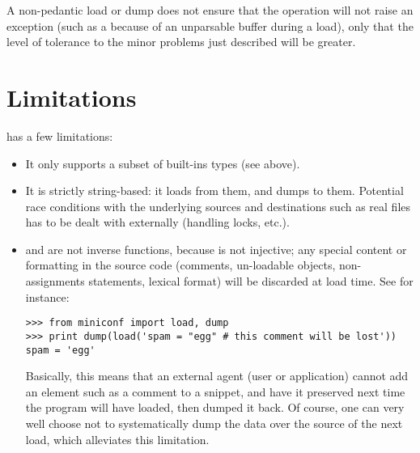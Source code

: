 \documentclass{howto}
\begin{document}
A non-pedantic load or dump does not ensure that the operation will not raise an
exception (such as a  because of an unparsable buffer
during a load), only that the level of tolerance to the minor problems just
described will be greater.

\section{Limitations}

 has a few limitations:

\begin{itemize}
\item
It only supports a subset of built-ins types (see above).

\item
It is strictly string-based: it loads from them, and dumps to them. Potential
race conditions with the underlying sources and destinations such as real files
has to be dealt with externally (handling locks, etc.).

\item
{} and  are not inverse functions, because
 is not injective; any special content or formatting in the
source code (comments, un-loadable objects, non-assignments statements, lexical
format) will be discarded at load time. See for instance:

\begin{verbatim}
>>> from miniconf import load, dump
>>> print dump(load('spam = "egg" # this comment will be lost'))
spam = 'egg'
\end{verbatim}

Basically, this means that an external agent (user or application)
cannot add an element such as a comment to a snippet, and have it
preserved next time the program will have loaded, then dumped it
back. Of course, one can very well choose not to systematically dump
the data over the source of the next load, which alleviates this
limitation.
\end{itemize}
\end{document}
